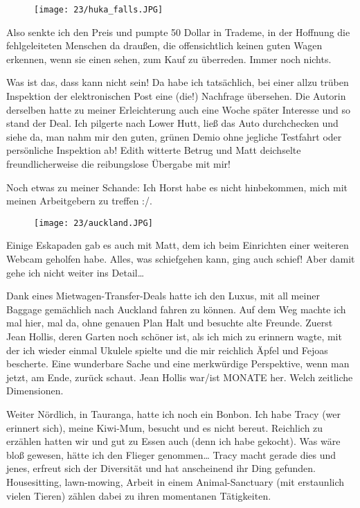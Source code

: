 \begin{figure}[h]
  \centering
  \texttt{[image: 23/huka\_falls.JPG]}
\end{figure}
Also senkte ich den Preis und pumpte 50 Dollar in Trademe, in der
Hoffnung die fehlgeleiteten Menschen da draußen, die offensichtlich
keinen guten Wagen erkennen, wenn sie einen sehen, zum Kauf zu
überreden. Immer noch nichts.

Was ist das, dass kann nicht sein! Da habe ich tatsächlich, bei einer
allzu trüben Inspektion der elektronischen Post eine (die!) Nachfrage
übersehen. Die Autorin derselben hatte zu meiner Erleichterung auch
eine Woche später Interesse und so stand der Deal. Ich pilgerte nach
Lower Hutt, ließ das Auto durchchecken und siehe da, man nahm mir den
guten, grünen Demio ohne jegliche Testfahrt oder persönliche
Inspektion ab! Edith witterte Betrug und Matt deichselte
freundlicherweise die reibungslose Übergabe mit mir!

Noch etwas zu meiner Schande: Ich Horst habe es nicht hinbekommen, mich
mit meinen Arbeitgebern zu treffen :/.


\begin{figure}[h]
  \centering
  \texttt{[image: 23/auckland.JPG]}
\end{figure}
Einige Eskapaden gab es auch mit Matt, dem ich beim Einrichten einer
weiteren Webcam geholfen habe. Alles, was schiefgehen kann, ging auch
schief! Aber damit gehe ich nicht weiter ins Detail\ldots{}

Dank eines Mietwagen-Transfer-Deals hatte ich den Luxus, mit all meiner
Baggage gemächlich nach Auckland fahren zu können. Auf dem Weg machte
ich mal hier, mal da, ohne genauen Plan Halt und besuchte alte Freunde.
Zuerst Jean Hollis, deren Garten noch schöner ist, als ich mich zu
erinnern wagte, mit der ich wieder einmal Ukulele spielte und die mir
reichlich Äpfel und Fejoas bescherte. Eine wunderbare Sache und eine
merkwürdige Perspektive, wenn man jetzt, am Ende, zurück schaut. Jean
Hollis war/ist MONATE her. Welch zeitliche Dimensionen.

Weiter Nördlich, in Tauranga, hatte ich noch ein Bonbon. Ich habe Tracy
(wer erinnert sich), meine Kiwi-Mum, besucht und es nicht bereut.
Reichlich zu erzählen hatten wir und gut zu Essen auch (denn ich habe
gekocht). Was wäre bloß gewesen, hätte ich den Flieger genommen\ldots{}
Tracy macht gerade dies und jenes, erfreut sich der Diversität und hat
anscheinend ihr Ding gefunden. Housesitting, lawn-mowing, Arbeit in
einem Animal-Sanctuary (mit erstaunlich vielen Tieren) zählen dabei zu
ihren momentanen Tätigkeiten.

